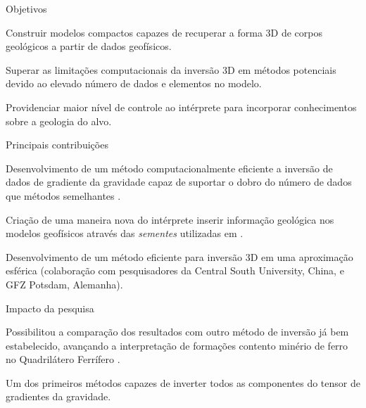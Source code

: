 \documentclass[10pt,a4paper,oneside]{book}
\begin{document}
\begin{fancyenum}{\faBullseye}{Objetivos}
   \item Construir modelos compactos capazes de recuperar a forma 3D de corpos
     geológicos a partir de dados geofísicos.
   \item Superar as limitações computacionais da inversão 3D em métodos
     potenciais devido ao elevado número de dados e elementos no modelo.
   \item Providenciar maior nível de controle ao intérprete para incorporar
     conhecimentos sobre a geologia do alvo.
\end{fancyenum}

\begin{fancyenum}{\faLightbulb}{Principais contribuições}
  \item Desenvolvimento de um método computacionalmente eficiente a inversão
    de dados de gradiente da gravidade capaz de suportar o dobro do número
    de dados que métodos semelhantes \citep{Uieda2012,Carlos2016}.
  \item Criação de uma maneira nova do intérprete inserir informação geológica
    nos modelos geofísicos através das \textit{sementes} utilizadas em
    \citet{Uieda2012}.
  \item Desenvolvimento de um método eficiente para inversão 3D em uma
    aproximação esférica \citep{Zhao2019} (colaboração com pesquisadores da
    Central South University, China, e GFZ Potsdam, Alemanha).
\end{fancyenum}

\begin{fancyenum}{\faRocket}{Impacto da pesquisa}
  \item Possibilitou a comparação dos resultados com outro método de inversão
    já bem estabelecido, avançando a interpretação de formações contento
    minério de ferro no Quadrilátero Ferrífero \citep{Carlos2014,Carlos2016}.
  \item Um dos primeiros métodos capazes de inverter todos as componentes do
    tensor de gradientes da gravidade.
\end{fancyenum}
\end{document}
